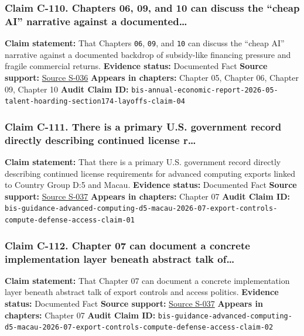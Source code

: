 \documentclass[
  american,
  11pt,
  letterpaper,
]{article}
\begin{document}
\subsubsection{Claim C-110. Chapters 06, 09, and 10 can discuss the
``cheap AI'' narrative against a
documented\ldots{}}\label{claim-c-110-chapters-06-09-and-10-can-discuss-the-cheap-ai-narrative-against-a-documented}

\textbf{Claim statement:} That Chapters \texttt{06}, \texttt{09}, and
\texttt{10} can discuss the ``cheap AI'' narrative against a documented
backdrop of subsidy-like financing pressure and fragile commercial
returns. \textbf{Evidence status:} Documented Fact \textbf{Source
support:} \hyperref[source-s-036-annual-economic-report-2026]{Source
S-036} \textbf{Appears in chapters:} Chapter 05, Chapter 06, Chapter 09,
Chapter 10 \textbf{Audit Claim ID:}
\texttt{bis-annual-economic-report-2026-05-talent-hoarding-section174-layoffs-claim-04}

\subsubsection{Claim C-111. There is a primary U.S. government record
directly describing continued license
r\ldots{}}\label{claim-c-111-there-is-a-primary-u-s-government-record-directly-describing-continued-license-r}

\textbf{Claim statement:} That there is a primary U.S. government record
directly describing continued license requirements for advanced
computing exports linked to Country Group D:5 and Macau.
\textbf{Evidence status:} Documented Fact \textbf{Source support:}
\hyperref[source-s-037-guidance-regarding-enforcement-of-license-requirements-for-advanced-computing-items-for-entities-headquartered-in-country-group-d-5-and-macau]{Source
S-037} \textbf{Appears in chapters:} Chapter 07 \textbf{Audit Claim ID:}
\texttt{bis-guidance-advanced-computing-d5-macau-2026-07-export-controls-compute-defense-access-claim-01}

\subsubsection{Claim C-112. Chapter 07 can document a concrete
implementation layer beneath abstract talk
of\ldots{}}\label{claim-c-112-chapter-07-can-document-a-concrete-implementation-layer-beneath-abstract-talk-of}

\textbf{Claim statement:} That Chapter 07 can document a concrete
implementation layer beneath abstract talk of export controls and access
politics. \textbf{Evidence status:} Documented Fact \textbf{Source
support:}
\hyperref[source-s-037-guidance-regarding-enforcement-of-license-requirements-for-advanced-computing-items-for-entities-headquartered-in-country-group-d-5-and-macau]{Source
S-037} \textbf{Appears in chapters:} Chapter 07 \textbf{Audit Claim ID:}
\texttt{bis-guidance-advanced-computing-d5-macau-2026-07-export-controls-compute-defense-access-claim-02}
\end{document}
